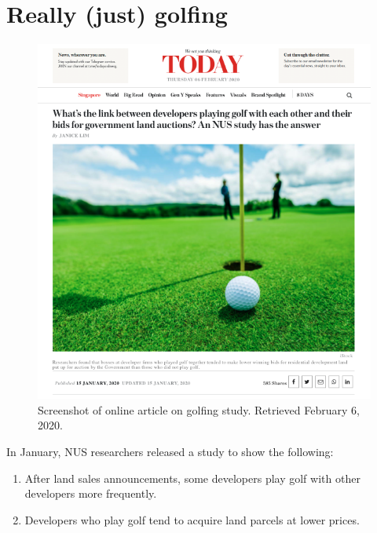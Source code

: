 \documentclass[openany]{book}
\providecommand{\tightlist}{%
  \setlength{\itemsep}{0pt}\setlength{\parskip}{0pt}}
\begin{document}
\section{Really (just) golfing}\label{golfing}

\begin{figure}

{\centering \includegraphics[width=0.9\linewidth]{images/yousayisay/news2} 

}

\caption{Screenshot of online article on golfing study. Retrieved February 6, 2020.}\label{fig:today-golf}
\end{figure}

In January, NUS researchers released a study to show the following:

\begin{enumerate}
\def\labelenumi{\arabic{enumi}.}
\tightlist
\item
  After land sales announcements, some developers play golf with other
  developers more frequently.
\item
  Developers who play golf tend to acquire land parcels at lower prices.
\end{enumerate}
\end{document}
